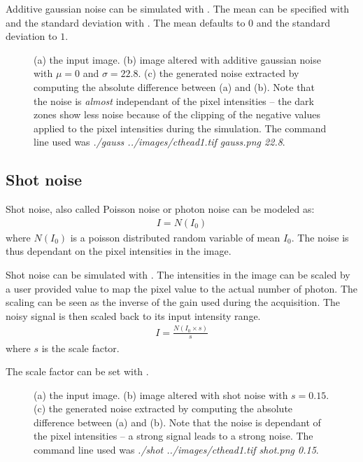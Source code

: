 \documentclass{InsightArticle}
\begin{document}
Additive gaussian noise can be simulated with . The mean
can be specified with  and the standard deviation with .
The mean defaults to $0$ and the standard deviation to $1$.

\begin{figure}[htbp]
\begin{center}
\caption{(a) the input image. (b) image altered with additive gaussian noise with $\mu = 0$ and
$\sigma = 22.8$. (c) the generated noise extracted by computing the absolute difference between (a)
and (b). Note that the noise is {\em almost} independant of the pixel intensities -- the dark zones
show less noise because of the clipping of the negative values applied to the pixel intensities
during the simulation. The command line used was {\em ./gauss ../images/cthead1.tif gauss.png 22.8}.}
\end{center}
\end{figure}

\subsection{Shot noise}

Shot noise, also called Poisson noise or photon noise can be modeled as:
\begin{eqnarray}
\label{eq:shot}
I = N(I_0)
\end{eqnarray}
where $N(I_0)$ is a poisson distributed random variable of mean $I_0$. The noise is thus dependant on
the pixel intensities in the image.

Shot noise can be simulated with . The intensities in the image can be
scaled by a user provided value to map the pixel value to the actual number of photon. The scaling
can be seen as the inverse of the gain used during the acquisition. The noisy signal is then scaled
back to its input intensity range.
\begin{eqnarray}
I = \frac{N(I_0 \times s)}{s}
\end{eqnarray}
where $s$ is the scale factor.

The scale factor can be set with .

\begin{figure}[htbp]
\begin{center}
\caption{(a) the input image. (b) image altered with shot noise with $s = 0.15$.
(c) the generated noise extracted by computing the absolute difference between (a)
and (b). Note that the noise is dependant of the pixel intensities -- a strong signal leads to a
strong noise. The command line used was {\em ./shot ../images/cthead1.tif shot.png 0.15}.}
\end{center}
\end{figure}
\end{document}
